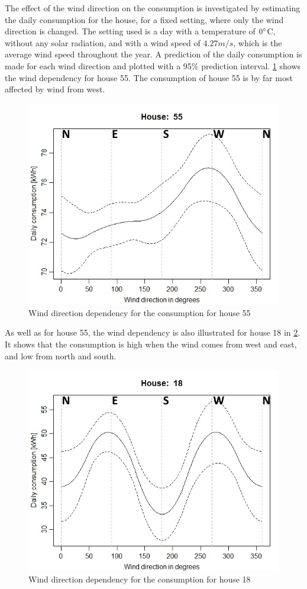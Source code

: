 \noindent The effect of the wind direction on the consumption is investigated by estimating the daily consumption for the house, for a fixed setting, where only the wind direction is changed. The setting used is a day with a temperature of $0 \degree$C, without any solar radiation, and with a wind speed of $4.27 m/s$, which is the average wind speed throughout the year. A prediction of the daily consumption is made for each wind direction and plotted with a 95\% prediction interval. \cref{fig: Wplot55} shows the wind dependency for house 55. The consumption of house 55 is by far most affected by wind from west.
\begin{figure}
    \centering
    \includegraphics[width=.8\textwidth]{../../../figures/Wplot55.jpeg}
    \caption{Wind direction dependency for the consumption for house 55}
    \label{fig: Wplot55}
\end{figure}
As well as for house 55, the wind dependency is also illustrated for house 18 in \cref{fig: Wplot18}. It shows that the consumption is high when the wind comes from west and east, and low from north and south.
\begin{figure}
    \centering
    \includegraphics[width=.8\textwidth]{../../../figures/Wplot18.jpeg}
    \caption{Wind direction dependency for the consumption for house 18}
    \label{fig: Wplot18}
\end{figure}

